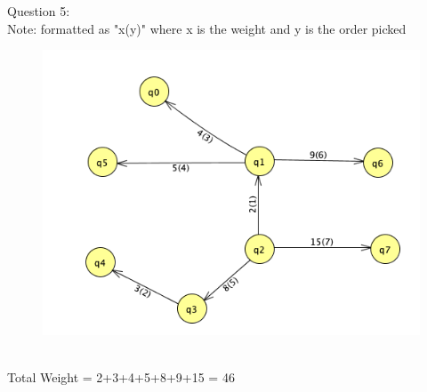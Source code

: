 \documentclass[12pt]{article}
\newcommand\tab[1][1cm]{\hspace*{#1}}
\begin{document}
Question 5:\\
\tab Note: formatted as "x(y)" where x is the weight and y is the order picked
\begin{figure}[ht]
  \includegraphics[width=\linewidth]{Q4.png}
\end{figure}\\
Total Weight = 2+3+4+5+8+9+15 = 46\\
\end{document}
